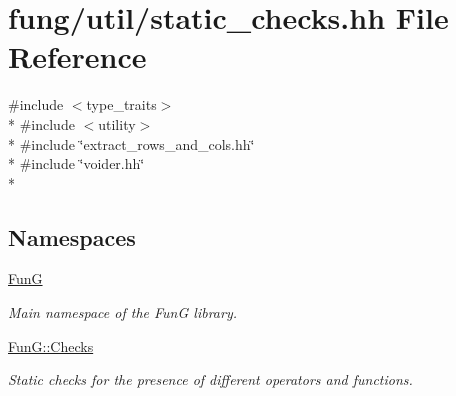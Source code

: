 \hypertarget{static__checks_8hh}{}\section{fung/util/static\+\_\+checks.hh File Reference}
\label{static__checks_8hh}
{\ttfamily \#include $<$type\+\_\+traits$>$}\\*
{\ttfamily \#include $<$utility$>$}\\*
{\ttfamily \#include \char`\"{}extract\+\_\+rows\+\_\+and\+\_\+cols.\+hh\char`\"{}}\\*
{\ttfamily \#include \char`\"{}voider.\+hh\char`\"{}}\\*
\subsection*{Namespaces}
\begin{DoxyCompactItemize}
\item 
 \hyperlink{namespaceFunG}{Fun\+G}
\begin{DoxyCompactList}\small\item\em Main namespace of the Fun\+G library. \end{DoxyCompactList}\item 
 \hyperlink{namespaceFunG_1_1Checks}{Fun\+G\+::\+Checks}
\begin{DoxyCompactList}\small\item\em Static checks for the presence of different operators and functions. \end{DoxyCompactList}\end{DoxyCompactItemize}

